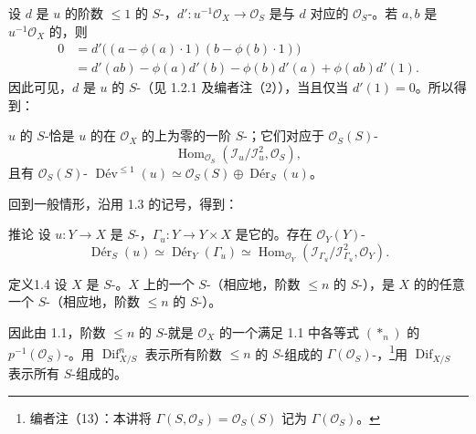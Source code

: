 设 $d$ 是 $u$ 的阶数 $\leq1$ 的 $S$-，$d':u^{-1}\mathcal O_X\to\mathcal O_S$ 是与 $d$ 对应的 $\mathcal O_S$-。若 $a,b$ 是 $u^{-1}\mathcal O_X$ 的，则
\[
\begin{aligned}
0&=d'\bigl((a-\phi(a)\cdot1)(b-\phi(b)\cdot1)\bigr)\\
 &=d'(ab)-\phi(a)d'(b)-\phi(b)d'(a)+\phi(ab)d'(1).
\end{aligned}
\]
因此可见，$d$ 是 $u$ 的 $S$-（见 1.2.1 及编者注（2）），当且仅当 $d'(1)=0$。所以得到：
\begin{SGAresult}{}{}
$u$ 的 $S$-恰是 $u$ 的在 $\mathcal O_X$ 的上为零的一阶 $S$-；它们对应于 $\mathcal O_S(S)$-
\[
\operatorname{Hom}_{\mathcal O_S}(\mathcal I_u/\mathcal I_u^2,\mathcal O_S),
\]
且有 $\mathcal O_S(S)$-
$\operatorname{D\text{é}v}^{\leq1}(u)\simeq\mathcal O_S(S)\oplus\operatorname{D\text{é}r}_S(u)$。
\end{SGAresult}
回到一般情形，沿用 1.3 的记号，得到：
\begin{SGAresult}{推论}{}
设 $u:Y\to X$ 是 $S$-，$\Gamma_u:Y\to Y\times X$ 是它的。存在 $\mathcal O_Y(Y)$-
\[
\operatorname{D\text{é}r}_S(u)\simeq\operatorname{D\text{é}r}_Y(\Gamma_u)\simeq\operatorname{Hom}_{\mathcal O_Y}(\mathcal I_{\Gamma_u}/\mathcal I_{\Gamma_u}^2,\mathcal O_Y).
\]
\end{SGAresult}
\begin{SGAresult}{定义}{1.4}
设 $X$ 是 $S$-。$X$ 上的一个 $S$-（相应地，阶数 $\leq n$ 的 $S$-），是 $X$ 的的任意一个 $S$-（相应地，阶数 $\leq n$ 的 $S$-）。
\end{SGAresult}
因此由 1.1，阶数 $\leq n$ 的 $S$-就是 $\mathcal O_X$ 的一个满足 1.1 中各等式 $(*_n)$ 的 $p^{-1}(\mathcal O_S)$-。用 $\operatorname{Dif}_{X/S}^n$ 表示所有阶数 $\leq n$ 的 $S$-组成的 $\Gamma(\mathcal O_S)$-，\footnote{编者注（13）：本讲将 $\Gamma(S,\mathcal O_S)=\mathcal O_S(S)$ 记为 $\Gamma(\mathcal O_S)$。}用 $\operatorname{Dif}_{X/S}$ 表示所有 $S$-组成的。

